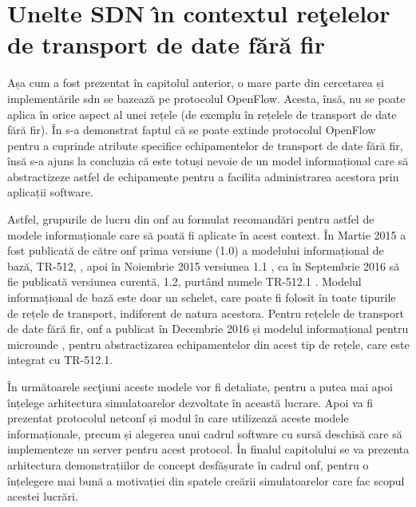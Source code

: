 \chapter{Unelte SDN \^{\i}n contextul reţelelor de transport de date fără fir\label{ch:sdn_in_contextul_wt}}

\graphicspath{ {cap-sdn_in_contextul_wt/figures/} }

Așa cum a fost prezentat în capitolul anterior, o mare parte din cercetarea și implementările \gls{sdn} se bazează pe protocolul OpenFlow. Acesta, însă, nu se poate aplica în orice aspect al unei rețele (de exemplu în rețelele de transport de date fără fir). În \cite{onf2015_poc1} s-a demonstrat faptul că se poate extinde protocolul OpenFlow pentru a cuprinde atribute specifice echipamentelor de transport de date fără fir, însă s-a ajuns la concluzia că este totuși nevoie de un model informațional care să abstractizeze astfel de echipamente pentru a facilita administrarea acestora prin aplicații software. 

Astfel, grupurile de lucru din \gls{onf} au formulat recomandări pentru astfel de modele informaționale care să poată fi aplicate în acest context. În Martie 2015 a fost publicată de către \gls{onf} prima versiune (1.0) a modelului informațional de bază, TR-512, \cite{onftr512v1.0}, apoi în Noiembrie 2015 versiunea 1.1 \cite{onftr512v1.1}, ca în Septembrie 2016 să fie publicată versiunea curentă, 1.2, purtând numele TR-512.1 \cite{onftr512v1.2}. Modelul informațional de bază este doar un schelet, care poate fi folosit în toate tipurile de rețele de transport, indiferent de natura acestora. Pentru rețelele de transport de date fără fir, \gls{onf} a publicat în Decembrie 2016 și modelul informațional pentru microunde \cite{onftr532}, pentru abstractizarea echipamentelor din acest tip de rețele, care este integrat cu TR-512.1. 

În următoarele secţiuni aceste modele vor fi detaliate, pentru a putea mai apoi înțelege arhitectura simulatoarelor dezvoltate în această lucrare. Apoi va fi prezentat protocolul \gls{netconf} și modul în care utilizează aceste modele informaționale, precum și alegerea unui cadrul software cu sursă deschisă care să implementeze un server pentru acest protocol. În finalul capitolului se va prezenta arhitectura demonstrațiilor de concept desfășurate în cadrul \gls{onf}, pentru o înțelegere mai bună a motivației din spatele creării simulatoarelor care fac scopul acestei lucrări.






